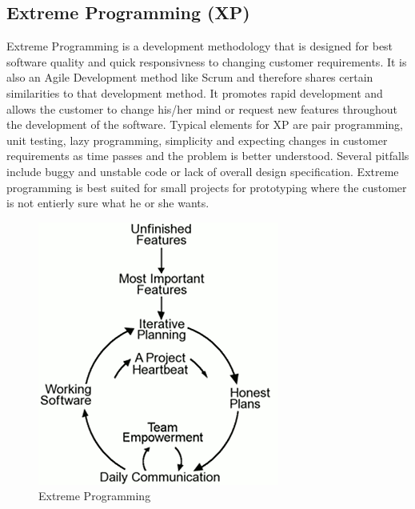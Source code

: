 \subsection{Extreme Programming (XP)}
Extreme Programming is a development methodology that is designed for best software quality and
quick responsivness to changing customer requirements. It is also an Agile Development method like
Scrum and therefore shares certain similarities to that development method. It promotes rapid
development and allows the customer to change his/her mind or request new features throughout
the development of the software. Typical elements for XP are pair programming, unit testing,
lazy programming, simplicity and expecting changes in customer requirements as time passes
and the problem is better understood. Several pitfalls include buggy and unstable code or lack of
overall design specification. Extreme programming is best suited for small projects for prototyping
where the customer is not entierly sure what he or she wants.
\begin{figure}[h!]
\centering \includegraphics[scale=0.75]{img/designmodel-xp} \caption{Extreme Programming}
\label{fig:desigmodel-xp}
\end{figure}

